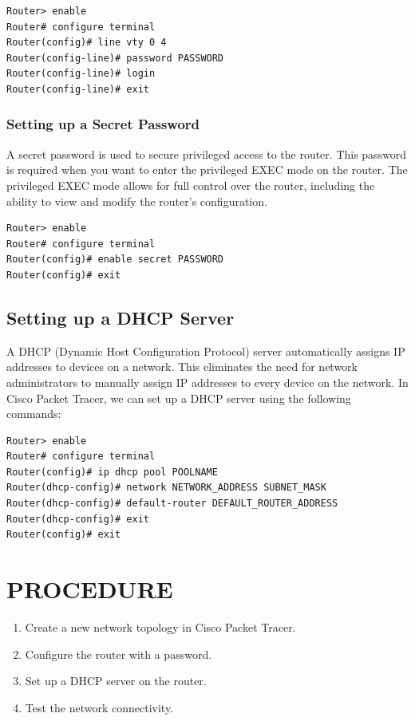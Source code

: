 \documentclass[a4paper,12pt]{article}
\begin{document}
\begin{verbatim}
Router> enable
Router# configure terminal
Router(config)# line vty 0 4
Router(config-line)# password PASSWORD
Router(config-line)# login
Router(config-line)# exit
\end{verbatim}


\subsubsection*{Setting up a Secret Password}
A secret password is used to secure privileged access to the router. This password is required when you want to enter the privileged EXEC mode on the router. The privileged EXEC mode allows for full control over the router, including the ability to view and modify the router's configuration.

\begin{verbatim}
Router> enable
Router# configure terminal
Router(config)# enable secret PASSWORD
Router(config)# exit
\end{verbatim}




\subsection*{Setting up a DHCP Server}
A DHCP (Dynamic Host Configuration Protocol) server automatically assigns IP addresses to devices on a network. This eliminates the need for network administrators to manually assign IP addresses to every device on the network. In Cisco Packet Tracer, we can set up a DHCP server using the following commands:

\begin{verbatim}
Router> enable
Router# configure terminal
Router(config)# ip dhcp pool POOLNAME
Router(dhcp-config)# network NETWORK_ADDRESS SUBNET_MASK
Router(dhcp-config)# default-router DEFAULT_ROUTER_ADDRESS
Router(dhcp-config)# exit
Router(config)# exit
\end{verbatim}




\section*{PROCEDURE}
\begin{enumerate}
    \item Create a new network topology in Cisco Packet Tracer.
    \item Configure the router with a password.
    \item Set up a DHCP server on the router.
    \item Test the network connectivity.
\end{enumerate}
\end{document}
